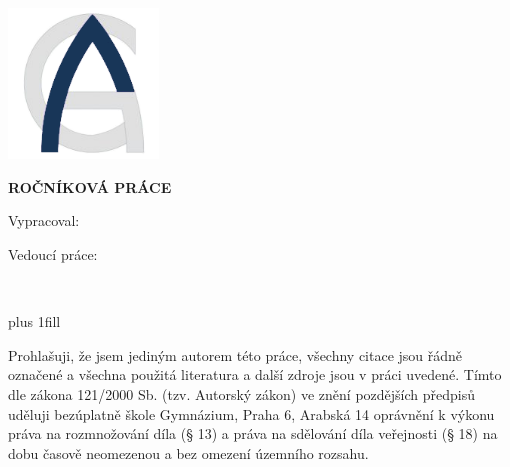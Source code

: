 


\pagestyle{empty}
\hypersetup{pageanchor=false}

\begin{center}

{\LARGE\bfseries\NazevSkoly}

\vspace{-18mm}
\vfill

{\LARGE\NazevOboru}

\vfill

\centerline{\mbox{\includegraphics[height=4cm]{../img/logo.png}}}

\vspace{-8mm}
\vfill

{\bf\Large ROČNÍKOVÁ PRÁCE}

\vfill


\vspace{15mm}

{\LARGE\bfseries\NazevPrace}


\vfill


Vypracoval: \hfill {\AutorPrace}

Vedoucí práce: \hfill {\Vedouci}

\vspace{15mm}
\MesicOdevzdani \ \RokOdevzdani

\end{center}



\newpage


\openright

\hypersetup{pageanchor=true}
\pagestyle{plain}
\vglue 0pt plus 1fill

\medskip\noindent
Prohlašuji, že jsem jediným autorem této práce, všechny citace jsou řádně označené a všechna použitá literatura a další zdroje jsou v práci uvedené.
Tímto dle zákona 121/2000 Sb. (tzv. Autorský zákon) ve znění pozdějších předpisů uděluji bezúplatně škole Gymnázium, Praha 6, Arabská 14 oprávnění k výkonu práva na rozmnožování díla (§ 13) a práva na sdělování díla veřejnosti (§ 18) na dobu časově neomezenou a bez omezení územního rozsahu.

